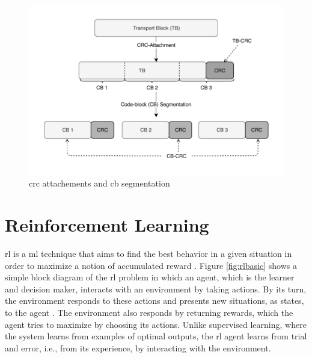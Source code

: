 \begin{figure}[htb]
    \includegraphics[width=\columnwidth]{figures/chp_theory/crc.pdf}
    \caption{\gls{crc} attachements and \gls{cb} segmentation}
    \label{fig:cbcrc}
\end{figure}


%




\section{Reinforcement Learning }
\label{sec:rl-theory}
\Gls{rl} is a \gls{ml} technique that aims to find the best behavior in a given situation in order to maximize a notion of accumulated reward \cite{Bishop07}.
%
Figure \ref{fig:rlbasic} shows a simple block diagram of the \gls{rl} problem in which an agent, which is the learner and decision maker, interacts with an environment by taking actions.
%
By its turn, the environment responds to these actions and presents new situations, as states, to the agent \cite{sutton2018rl}.
%
The environment also responds by returning rewards, which the agent tries to maximize by choosing its actions.
%
Unlike supervised learning, where the system learns from examples of optimal outputs, the \gls{rl} agent learns from trial and error, i.e., from its experience, by interacting with the environment.

